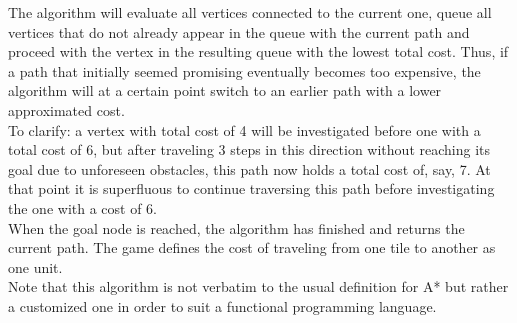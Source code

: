 \documentclass{article}
\begin{document}
\noindent The algorithm will evaluate all vertices connected to the current one, queue all vertices that do not already appear in the queue with the current path and proceed with the vertex in the resulting queue with the lowest total cost. Thus, if a path that initially seemed promising eventually becomes too expensive, the algorithm will at a certain point switch to an earlier path with a lower approximated cost.\\
        \newline
To clarify: a vertex with total cost of 4 will be investigated before one with a total cost of 6, but after traveling 3 steps in this direction without reaching its goal due to unforeseen obstacles, this path now holds a total cost of, say, 7. At that point it is superfluous to continue traversing this path before investigating the one with a cost of 6.\\
        \newline
When the goal node is reached, the algorithm has finished and returns the current path. The game defines the cost of traveling from one tile to another as one unit.\\
		\newline
Note that this algorithm is not verbatim to the usual definition for A* but rather a customized one in order to suit a functional programming language.
\end{document}
